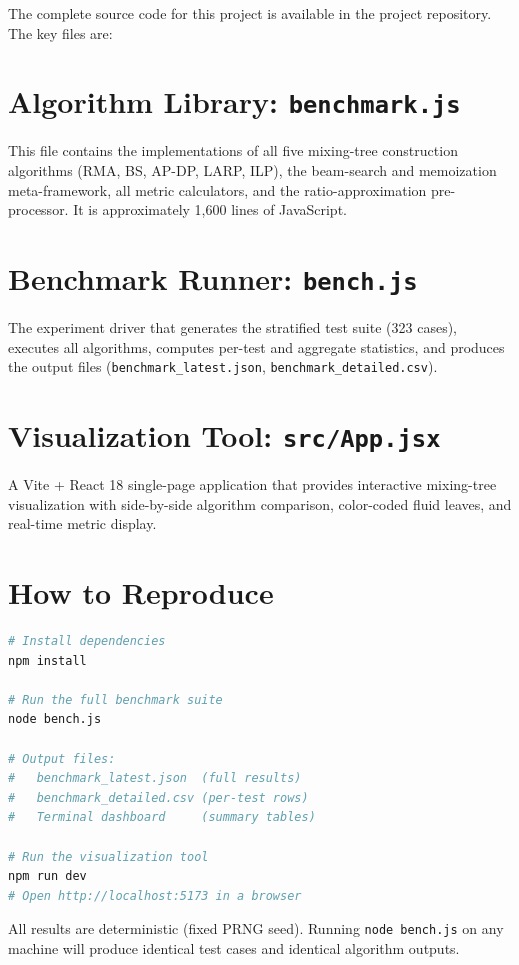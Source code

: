 
The complete source code for this project is available in the project repository. The key files are:

\section{Algorithm Library: \texttt{benchmark.js}}

This file contains the implementations of all five mixing-tree construction algorithms (RMA, BS, AP-DP, LARP, ILP), the beam-search and memoization meta-framework, all metric calculators, and the ratio-approximation pre-processor. It is approximately 1,600 lines of JavaScript.

\section{Benchmark Runner: \texttt{bench.js}}

The experiment driver that generates the stratified test suite (323 cases), executes all algorithms, computes per-test and aggregate statistics, and produces the output files (\texttt{benchmark\_latest.json}, \texttt{benchmark\_detailed.csv}).

\section{Visualization Tool: \texttt{src/App.jsx}}

A Vite + React 18 single-page application that provides interactive mixing-tree visualization with side-by-side algorithm comparison, color-coded fluid leaves, and real-time metric display.

\section{How to Reproduce}

\begin{lstlisting}[language=bash, caption={Reproducing the benchmark results.}]
# Install dependencies
npm install

# Run the full benchmark suite
node bench.js

# Output files:
#   benchmark_latest.json  (full results)
#   benchmark_detailed.csv (per-test rows)
#   Terminal dashboard     (summary tables)

# Run the visualization tool
npm run dev
# Open http://localhost:5173 in a browser
\end{lstlisting}

All results are deterministic (fixed PRNG seed). Running \texttt{node bench.js} on any machine will produce identical test cases and identical algorithm outputs.
